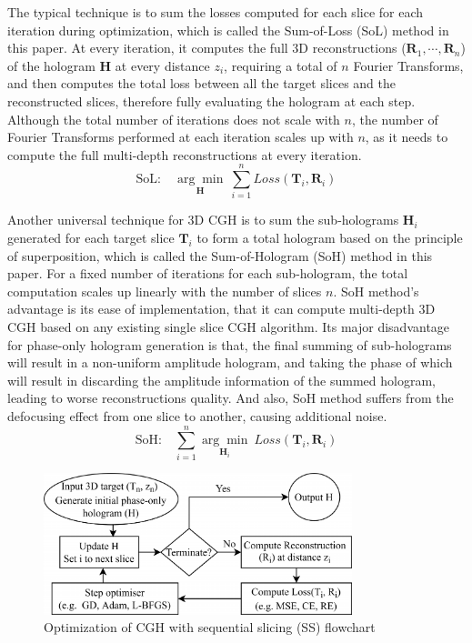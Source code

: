 The typical technique is to sum the losses computed for each slice for each iteration during optimization, which is called the Sum-of-Loss (SoL) method in this paper. At every iteration, it computes the full 3D reconstructions ($\textbf{R}_1, \cdots, \textbf{R}_n$) of the hologram $\textbf{H}$ at every distance $z_i$, requiring a total of $n$ Fourier Transforms, and then computes the total loss between all the target slices and the reconstructed slices, therefore fully evaluating the hologram at each step. Although the total number of iterations does not scale with $n$, the number of Fourier Transforms performed at each iteration scales up with $n$, as it needs to compute the full multi-depth reconstructions at every iteration.
\begin{equation}
	\text{SoL:}\quad \underset{\textbf{H}}{\arg \min}\ \sum_{i = 1}^{n} Loss(\textbf{T}_i, \textbf{R}_i)
\end{equation}

Another universal technique for 3D CGH is to sum the sub-holograms $\textbf{H}_i$ generated for each target slice $\textbf{T}_i$ to form a total hologram based on the principle of superposition, which is called the Sum-of-Hologram (SoH) method in this paper. For a fixed number of iterations for each sub-hologram, the total computation scales up linearly with the number of slices $n$. SoH method's advantage is its ease of implementation, that it can compute multi-depth 3D CGH based on any existing single slice CGH algorithm. Its major disadvantage for phase-only hologram generation is that, the final summing of sub-holograms will result in a non-uniform amplitude hologram, and taking the phase of which will result in discarding the amplitude information of the summed hologram, leading to worse reconstructions quality. And also, SoH method suffers from the defocusing effect from one slice to another, causing additional noise.
\begin{equation}
	\text{SoH:}\quad \sum_{i = 1}^{n} \underset{\textbf{H}_i}{\arg \min}\ Loss(\textbf{T}_i, \textbf{R}_i)
\end{equation}

\begin{figure}[h!]
	\centering
	\includegraphics[width=0.8\textwidth]{optim3d-cgh-flowchart}
	\caption{Optimization of CGH with sequential slicing (SS) flowchart}
	\label{fig:optim3d-cgh-flowchart}
\end{figure}

